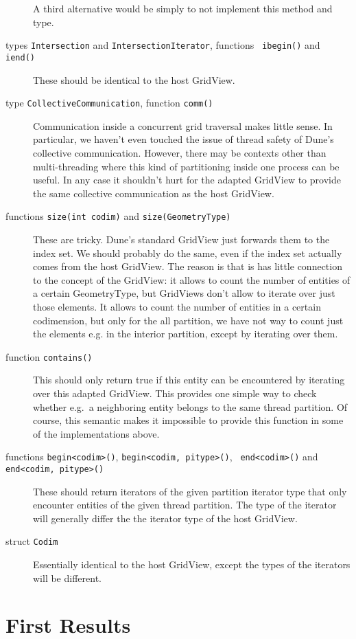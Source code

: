 \documentclass{article}
\newcommand\dune{Dune\xspace}
\newcommand\Dune{Dune\xspace}
\begin{document}
\begin{description}
  A third alternative would be simply to not implement this method and type.
\item[types {\tt Intersection} and {\tt IntersectionIterator}, functions {\tt
    ibegin()} and {\tt iend()}] These should be identical to the host
  GridView.
\item[type {\tt CollectiveCommunication}, function {\tt comm()}] Communication
  inside a concurrent grid traversal makes little sense.  In particular, we
  haven't even touched the issue of thread safety of \dune's collective
  communication.  However, there may be contexts other than multi-threading
  where this kind of partitioning inside one process can be useful.  In any
  case it shouldn't hurt for the adapted GridView to provide the same
  collective communication as the host GridView.
\item[functions {\tt size(int codim)} and {\tt size(GeometryType)}] These are
  tricky.  \Dune's standard GridView just forwards them to the index set.  We
  should probably do the same, even if the index set actually comes from the
  host GridView.  The reason is that is has little connection to the concept
  of the GridView: it allows to count the number of entities of a certain
  GeometryType, but GridViews don't allow to iterate over just those elements.
  It allows to count the number of entities in a certain codimension, but only
  for the all partition, we have not way to count just the elements e.g. in
  the interior partition, except by iterating over them.
\item[function {\tt contains()}] This should only return true if this entity
  can be encountered by iterating over this adapted GridView.  This provides
  one simple way to check whether e.g.\ a neighboring entity belongs to the
  same thread partition.  Of course, this semantic makes it impossible to
  provide this function in some of the implementations above.
\item[functions {\tt begin<codim>()}, {\tt begin<codim, pitype>()}, {\tt
    end<codim>()} and {\tt end<codim, pitype>()}] These should return
  iterators of the given partition iterator type that only encounter entities
  of the given thread partition.  The type of the iterator will generally
  differ the the iterator type of the host GridView.
\item[struct {\tt Codim}] Essentially identical to the host GridView, except
  the types of the iterators will be different.
\end{description}

\section{First Results}
\end{document}
